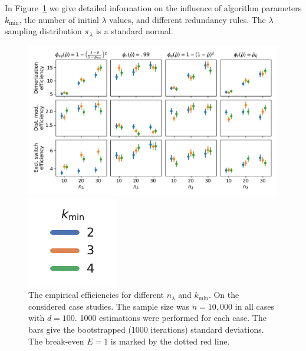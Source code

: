 In Figure~\ref{fig:efficiencies_alg_params} we give detailed information on the influence of
algorithm parameters $k_{\min}$, the number of initial $\lambda$ values, and
different redundancy rules.
The $\lambda$ sampling distribution $\pi_{\lambda}$ is a standard normal.
\begin{figure}[h]
    \centering    
    \begin{minipage}{.9\textwidth}
    \centering
    \includegraphics[scale=.4]{gfx/efficiency_pminfrac.pdf}
    \end{minipage}
    \begin{minipage}{0.09\textwidth}
    \includegraphics[scale=.55]{gfx/legend.pdf}
    \end{minipage}
	\caption[Influence of the redundancy heuristic and $k_{\min}$]{The empirical efficiencies for different $n_\lambda$ and $k_{\min}$.
    On the considered case studies. The sample size was $n=10,\!000$ in all cases
    with $d=100$.
    1000 estimations were performed for each case.
    The bars give the 
    bootstrapped (1000 iterations) standard deviations.
    The break-even $E=1$ is marked by the dotted red line.\label{fig:efficiencies_alg_params}}
\end{figure}

